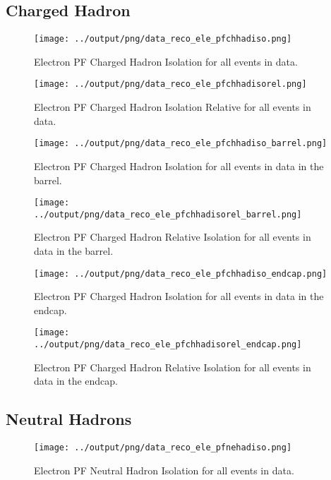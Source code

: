 \documentclass[11pt]{book}
\begin{document}
\subsection{Charged Hadron}
\begin{figure}[htb]
\centering
\texttt{[image: ../output/png/data\_reco\_ele\_pfchhadiso.png]}
\caption{Electron PF Charged Hadron Isolation for all events in data.}
\label{fig:data_ele_pfchhadiso}
\end{figure}

\begin{figure}[htb]
\centering
\texttt{[image: ../output/png/data\_reco\_ele\_pfchhadisorel.png]}
\caption{Electron PF Charged Hadron Isolation Relative for all events in data.}
\label{fig:data_ele_pfchhadisorel}
\end{figure}

\begin{figure}[htb]
\centering
\texttt{[image: ../output/png/data\_reco\_ele\_pfchhadiso\_barrel.png]}
\caption{Electron PF Charged Hadron Isolation for all events in data in the barrel.}
\label{fig:data_ele_pfchhadiso_barrel}
\end{figure}

\begin{figure}[htb]
\centering
\texttt{[image: ../output/png/data\_reco\_ele\_pfchhadisorel\_barrel.png]}
\caption{Electron PF Charged Hadron Relative Isolation for all events in data in the barrel.}
\label{fig:data_ele_pfchhadisorel_barrel}
\end{figure}

\begin{figure}[htb]
\centering
\texttt{[image: ../output/png/data\_reco\_ele\_pfchhadiso\_endcap.png]}
\caption{Electron PF Charged Hadron Isolation for all events in data in the endcap.}
\label{fig:data_ele_pfchhadiso_endcap}
\end{figure}

\begin{figure}[htb]
\centering
\texttt{[image: ../output/png/data\_reco\_ele\_pfchhadisorel\_endcap.png]}
\caption{Electron PF Charged Hadron Relative Isolation for all events in data in the endcap.}
\label{fig:data_ele_pfchhadisorel_endcap}
\end{figure}
\clearpage

\subsection{Neutral Hadrons}
\begin{figure}[htb]
\centering
\texttt{[image: ../output/png/data\_reco\_ele\_pfnehadiso.png]}
\caption{Electron PF Neutral Hadron Isolation for all events in data.}
\label{fig:data_ele_pfnehadiso}
\end{figure}
\end{document}
